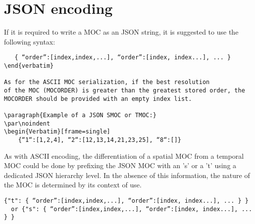 \section{JSON encoding}
If it is required to write a MOC as an JSON string,
it is suggested to use the following syntax:

\par\noindent
\begin{Verbatim}
   { “order”:[index,index,...], “order”:[index, index...], ... }
\end{verbatim}

As for the ASCII MOC serialization, if the best resolution
of the MOC (MOCORDER) is greater than the greatest stored order, the
MOCORDER should be provided with an empty index list.

\paragraph{Example of a JSON SMOC or TMOC:}
\par\noindent
\begin{Verbatim}[frame=single]
    {“1“:[1,2,4], “2“:[12,13,14,21,23,25], “8“:[]}
\end{Verbatim}

As with ASCII encoding, the differentiation of a spatial MOC from a temporal MOC could be done by prefixing the JSON MOC with an 's' or a 't' using a dedicated JSON hierarchy level. In the absence of this information, the nature of the MOC is determined by its context of use.

\par\noindent
\begin{Verbatim}[frame=single, xrightmargin=-3cm] 
     {"t": { “order”:[index,index,...], “order”:[index, index...], ... } }
  or {"s": { “order”:[index,index,...], “order”:[index, index...], ... } }
\end{Verbatim}


